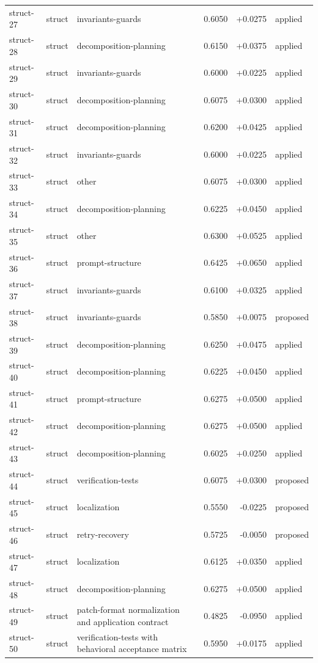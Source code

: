 \begin{center}
\begin{longtable}{llp{5.2cm}rrl}
struct-27 & struct & invariants-guards & 0.6050 & +0.0275 & applied \\
struct-28 & struct & decomposition-planning & 0.6150 & +0.0375 & applied \\
struct-29 & struct & invariants-guards & 0.6000 & +0.0225 & applied \\
struct-30 & struct & decomposition-planning & 0.6075 & +0.0300 & applied \\
struct-31 & struct & decomposition-planning & 0.6200 & +0.0425 & applied \\
struct-32 & struct & invariants-guards & 0.6000 & +0.0225 & applied \\
struct-33 & struct & other & 0.6075 & +0.0300 & applied \\
struct-34 & struct & decomposition-planning & 0.6225 & +0.0450 & applied \\
struct-35 & struct & other & 0.6300 & +0.0525 & applied \\
struct-36 & struct & prompt-structure & 0.6425 & +0.0650 & applied \\
struct-37 & struct & invariants-guards & 0.6100 & +0.0325 & applied \\
struct-38 & struct & invariants-guards & 0.5850 & +0.0075 & proposed \\
struct-39 & struct & decomposition-planning & 0.6250 & +0.0475 & applied \\
struct-40 & struct & decomposition-planning & 0.6225 & +0.0450 & applied \\
struct-41 & struct & prompt-structure & 0.6275 & +0.0500 & applied \\
struct-42 & struct & decomposition-planning & 0.6275 & +0.0500 & applied \\
struct-43 & struct & decomposition-planning & 0.6025 & +0.0250 & applied \\
struct-44 & struct & verification-tests & 0.6075 & +0.0300 & proposed \\
struct-45 & struct & localization & 0.5550 & -0.0225 & proposed \\
struct-46 & struct & retry-recovery & 0.5725 & -0.0050 & proposed \\
struct-47 & struct & localization & 0.6125 & +0.0350 & applied \\
struct-48 & struct & decomposition-planning & 0.6275 & +0.0500 & applied \\
struct-49 & struct & patch-format normalization and application contract & 0.4825 & -0.0950 & applied \\
struct-50 & struct & verification-tests with behavioral acceptance matrix & 0.5950 & +0.0175 & applied \\

\end{longtable}
\end{center}
